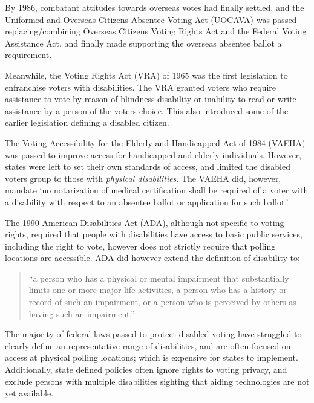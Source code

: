 By 1986, combatant attitudes towards overseas votes had finally settled, and
the Uniformed and Overseas Citizens Absentee Voting Act (UOCAVA) was passed
replacing/combining Overseas Citizens Voting Rights Act and the Federal Voting
Assistance Act, and finally made supporting the overseas absentee ballot a
requirement.

Meanwhile, the Voting Rights Act (VRA) of 1965 was the first legislation to
enfranchise voters with disabilities. The VRA granted voters who require
assistance to vote by reason of blindness disability or inability to read or
write assistance by a person of the voters choice. This also introduced some of
the earlier legislation defining a disabled citizen.

The Voting Accessibility for the Elderly and Handicapped Act of 1984 (VAEHA)
was passed to improve access for handicapped and elderly individuals. However,
states were left to set their own standards of access, and limited the disabled
voters group to those with {\em physical disabilities}. The VAEHA did, however,
mandate `no notarization of medical certification shall be required of a voter
with a disability with respect to an absentee ballot or application for such
ballot.'

The 1990 American Disabilities Act (ADA), although not specific to voting
rights, required that people with disabilities have access to basic public
services, including the right to vote, however does not strictly require that
polling locations are accessible. ADA did however extend the definition of
disability to:
\begin{quote}
``a person who has a physical or mental impairment that substantially limits
one or more major life activities, a person who has a history or record of such
an impairment, or a person who is perceived by others as having such an
impairment.''
\end{quote}

The majority of federal laws passed to protect disabled voting have struggled
to clearly define an representative range of disabilities, and are often
focused on access at physical polling locations; which is expensive for states
to implement. Additionally, state defined policies often ignore rights to
voting privacy, and exclude persons with multiple disabilities sighting that
aiding technologies are not yet available.


